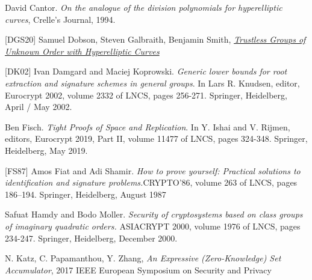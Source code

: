 \documentclass[11pt, lettersize, notitlepage, leqno, footskip=0.6cm]{article}
\newcommand{\noin}{\noindent}
\numberwithin{equation}{section}
\begin{document}
\noin [Can94] David Cantor. \textit{On the analogue of the division polynomials for hyperelliptic curves}, Crelle's Journal, 1994.\vspace{0.1cm}


\noin \hypertarget{DGS20}{[DGS20]} Samuel Dobson, Steven Galbraith, Benjamin Smith, \href{https://eprint.iacr.org/2020/196}{\textit{Trustless Groups of Unknown Order with Hyperelliptic Curves}} \vspace{0.1cm}

\noin \hypertarget{{DK02}}{[DK02]} Ivan Damgard and Maciej Koprowski. \textit{Generic lower bounds for root extraction and signature schemes in general groups}. In Lars R. Knudsen, editor, Eurocrypt 2002, volume 2332 of LNCS, pages 256-271. Springer, Heidelberg, April / May 2002.\vspace{0.1cm}

\noin [Fis18] Ben Fisch. \textit{Tight Proofs of Space and Replication}. In Y. Ishai and V. Rijmen, editors, Eurocrypt 2019, Part II, volume 11477 of LNCS, pages 324-348. Springer, Heidelberg, May 2019. \vspace{0.1cm}

\noin \hypertarget{FS87}{[FS87]} Amos Fiat and Adi Shamir. \textit{How to prove yourself: Practical solutions to identification and signature problems.}CRYPTO’86, volume 263 of LNCS, pages 186–194. Springer, Heidelberg, August 1987\vspace{0.1cm}

\noin [HM00] Safuat Hamdy and Bodo Moller. \textit{Security of cryptosystems based on class groups of imaginary quadratic orders.} ASIACRYPT 2000, volume 1976 of LNCS, pages 234-247.
Springer, Heidelberg, December 2000.\vspace{0.1cm}

\noin [KPZ17] N. Katz, C. Papamanthou, Y. Zhang, \textit{An Expressive (Zero-Knowledge) Set Accumulator}, 2017 IEEE European Symposium on Security and Privacy \vspace{0.1cm}
\end{document}
